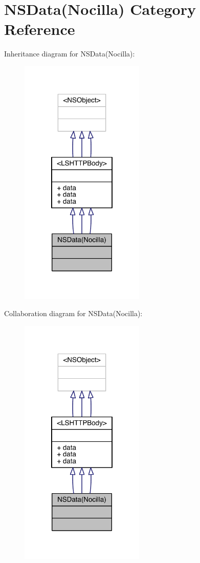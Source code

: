 \hypertarget{category_n_s_data_07_nocilla_08}{\section{N\-S\-Data(Nocilla) Category Reference}
\label{category_n_s_data_07_nocilla_08}
}


Inheritance diagram for N\-S\-Data(Nocilla)\-:\nopagebreak
\begin{figure}[H]
\begin{center}
\leavevmode
\includegraphics[width=168pt]{category_n_s_data_07_nocilla_08__inherit__graph}
\end{center}
\end{figure}


Collaboration diagram for N\-S\-Data(Nocilla)\-:\nopagebreak
\begin{figure}[H]
\begin{center}
\leavevmode
\includegraphics[width=168pt]{category_n_s_data_07_nocilla_08__coll__graph}
\end{center}
\end{figure}
